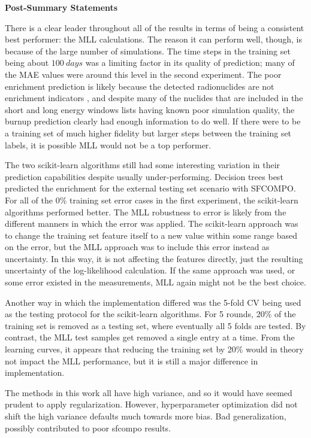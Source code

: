 \noindent \textbf{Post-Summary Statements}

There is a clear leader throughout all of the results in terms of being a
consistent best performer: the \gls{MLL} calculations. The reason it can
perform well, though, is because of the large number of simulations.  The time
steps in the training set being about $100\:days$ was a limiting factor in its
quality of prediction; many of the \gls{MAE} values were around this level in
the second experiment. The poor enrichment prediction is likely because the
detected radionuclides are not enrichment indicators , and despite
many of the nuclides that are included in the short and long energy windows
lists having known poor simulation quality, the burnup prediction clearly had
enough information to do well.  If there were to be a training set of much
higher fidelity but larger steps between the training set labels, it is
possible \gls{MLL} would not be a top performer. 

The two scikit-learn algorithms still had some interesting variation in their
prediction capabilities despite usually under-performing. Decision trees best
predicted the enrichment for the external testing set scenario with
\gls{SFCOMPO}. For all of the 0\% training set error cases in the first
experiment, the scikit-learn algorithms performed better.  The \gls{MLL}
robustness to error is likely from the different manners in which the error was
applied.  The scikit-learn approach was to change the training set feature
itself to a new value within some range based on the error, but the \gls{MLL}
approach was to include this error instead as uncertainty. In this way, it is
not affecting the features directly, just the resulting uncertainty of the
log-likelihood calculation. If the same approach was used, or some error
existed in the measurements, \gls{MLL} again might not be the best choice. 

Another way in which the implementation differed was the 5-fold \gls{CV} being
used as the testing protocol for the scikit-learn algorithms. For 5 rounds,
20\% of the training set is removed as a testing set, where eventually all 5
folds are tested.  By contrast, the \gls{MLL} test samples get removed a single
entry at a time.  From the learning curves, it appears that reducing the
training set by 20\% would in theory not impact the \gls{MLL} performance, but
it is still a major difference in implementation. 

The methods in this work all have high variance, and so it would have seemed
prudent to apply regularization. However, hyperparameter optimization did not
shift the high variance defaults much towards more bias. Bad generalization,
possibly contributed to poor sfcompo results.   

